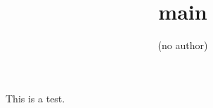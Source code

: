 \documentclass{article}
\begin{document}
\title{main}
\author{(no author)}
\maketitle
This is a test.
\end{document}
